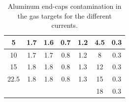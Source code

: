 \documentclass[final,5p,times,twocolumn]{elsarticle}
\begin{document}
\begin{table}[h!]
\begin{tabular}{|c|c|c|c|c|c|c|}
5                                                                & 1.7                                                             & 1.6                                                              & 0.7                                                             & 1.2                                                             & 4.5                                                             & 0.3                                                                                \\ \hline
10                                                               & 1.7                                                             & 1.7                                                              & 0.8                                                             & 1.2                                                             & 8                                                               & 0.3                                                                                \\ \hline
15                                                               & 1.8                                                             & 1.8                                                              & 0.8                                                             & 1.3                                                             & 12                                                              & 0.3                                                                                \\ \hline
22.5                                                             & 1.8                                                             & 1.8                                                              & 0.8                                                             & 1.3                                                             & 15                                                              & 0.3                                                                                \\ \hline
\multicolumn{5}{|l|}{}                                                                                                                                                                                                                                                                                                                    & 18                                                              & 0.3                                                                                \\ \hline
\end{tabular}
\caption{Aluminum end-caps contamination in the gas targets for the different currents.}
\label{tab:contamination_al}
\end{table}
\end{document}
